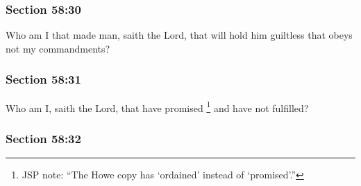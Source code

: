 
	\subsubsection{Section 58:30} %
		\label{DC58-30}

		Who am I that made man, saith the Lord, that will hold him guiltless that obeys not my commandments?


	\subsubsection{Section 58:31} %
		\label{DC58-31}

		Who am I, saith the Lord, that have promised%
			\footnote{%
				JSP note: ``The Howe copy has `ordained' instead of `promised'.''
				}
		and have not fulfilled?


	\subsubsection{Section 58:32} %
		\label{DC58-32}


